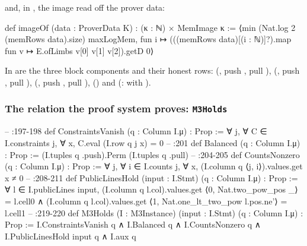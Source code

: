 and, in , the image read off the prover data:
\begin{leancode}
def imageOf (data : ProverData K) : (κ : ℕ) × MemImage κ :=
  ⟨min (Nat.log 2 (memRows data).size) maxLogMem,
    fun i ↦ (((memRows data)[(i : ℕ)]?).map fun v ↦ E.ofLimbs v[0] v[1] v[2]).getD 0⟩
\end{leancode}

In  are the three block components and their honest rows: 
(, push , pull ), 
(, push , pull ),
 (, push , pull
),  () and 
(:  with
).

\subsubsection{The relation the proof system proves: \texorpdfstring{\protect\texttt{M3Holds}}{M3Holds}}\label{sec:gen-boundary-m3holds}

\begin{leancode}
-- :197-198
def ConstraintsVanish (q : Column I.μ) : Prop :=
  ∀ j, ∀ C ∈ I.constraints j, ∀ x, C.eval (I.row q j x) = 0
-- :201
def Balanced (q : Column I.μ) : Prop := (I.tuples q .push).Perm (I.tuples q .pull)
-- :204-205
def CountsNonzero (q : Column I.μ) : Prop :=
  ∀ j, ∀ i ∈ I.counts j, ∀ x, (I.column q ⟨j, i⟩).values.get x ≠ 0
-- :208-211
def PublicLinesHold (input : I.Stmt) (q : Column I.μ) : Prop :=
  ∀ l ∈ I.publicLines input,
    (I.column q l.col).values.get ⟨0, Nat.two_pow_pos _⟩ = l.cell0 ∧
      (I.column q l.col).values.get ⟨1, Nat.one_lt_two_pow l.pos.ne'⟩ = l.cell1
-- :219-220
def M3Holds (I : M3Instance) (input : I.Stmt) (q : Column I.μ) : Prop :=
  I.ConstraintsVanish q ∧ I.Balanced q ∧ I.CountsNonzero q ∧ I.PublicLinesHold input q ∧ I.aux q
\end{leancode}

